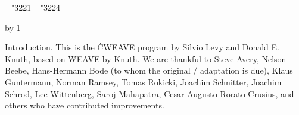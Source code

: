 






\def\hang{\hangindent 3em\indent\ignorespaces}
\def\pb{$\.|\ldots\.|$} %
\def\v{\char'174} %
\def\dleft{[\![} \def\dright{]\!]} %
\mathchardef\RA="3221 %
\mathchardef\BA="3224 %
\def\({} %
\def\TeXxstring{\\{\TEX/\_string}}
\def\skipxTeX{\\{skip\_\TEX/}}
\def\copyxTeX{\\{copy\_\TEX/}}

\def\title{CWEAVE (Version 4.7)}
\def\topofcontents{\null\vfill
  \centerline{\titlefont The {\ttitlefont CWEAVE} processor}
  \vskip 15pt
  \centerline{(Version 4.7)}
  \vfill}
\def\botofcontents{\vfill\titlefalse}
\def\contentspagenumber{109}
\def\title{APPENDIX F: CWEAVE}
\let\K=\leftarrow
\pageno=\contentspagenumber \advance\pageno by 1
\let\maybe=\iftrue


Introduction.
This is the \.{CWEAVE} program by Silvio Levy and Donald E. Knuth,
based on \.{WEAVE} by Knuth.
We are thankful to Steve Avery,
Nelson Beebe, Hans-Hermann Bode (to whom the original \CPLUSPLUS/ adaptation
is due), Klaus Guntermann, Norman Ramsey, Tomas Rokicki, Joachim Schnitter,
Joachim Schrod, Lee Wittenberg, Saroj Mahapatra, Cesar Augusto Rorato
Crusius, and others who have contributed improvements.

